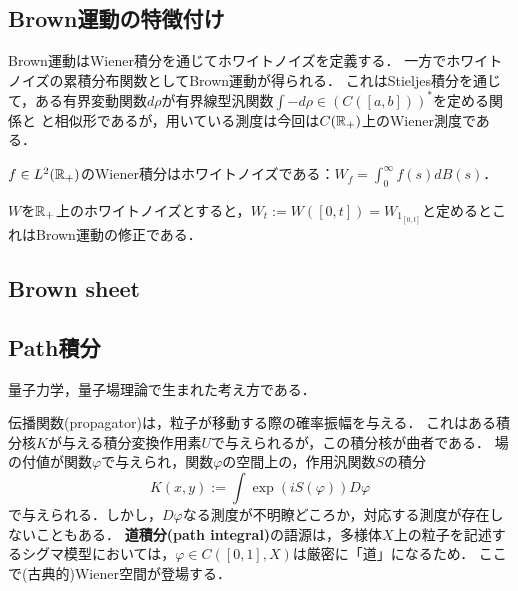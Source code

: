 \documentclass[uplatex,dvipdfmx]{jsreport}
\begin{document}
\subsection{Brown運動の特徴付け}

\begin{tcolorbox}[colframe=ForestGreen, colback=ForestGreen!10!white,breakable,colbacktitle=ForestGreen!40!white,coltitle=black,fonttitle=\bfseries\sffamily,
title=]
    Brown運動はWiener積分を通じてホワイトノイズを定義する．
    一方でホワイトノイズの累積分布関数としてBrown運動が得られる．
    これはStieljes積分を通じて，ある有界変動関数$d\rho$が有界線型汎関数$\int-d\rho\in (C([a,b]))^*$を定める関係と
    と相似形であるが，用いている測度は今回は$C(\mathbb{R}_+)$上のWiener測度である．
\end{tcolorbox}

\begin{proposition}
    $f\in L^2(\mathbb{R}_+)$のWiener積分はホワイトノイズである：$W_f=\int^\infty_0f(s)dB(s)$．
\end{proposition}

\begin{proposition}
    $W$を$\mathbb{R}_+$上のホワイトノイズとすると，$W_t:=W([0,t])=W_{1_{[0,t]}}$と定めるとこれはBrown運動の修正である．
\end{proposition}

\subsection{Brown sheet}

\subsection{Path積分}

\begin{tcolorbox}[colframe=ForestGreen, colback=ForestGreen!10!white,breakable,colbacktitle=ForestGreen!40!white,coltitle=black,fonttitle=\bfseries\sffamily,
title=]
    量子力学，量子場理論で生まれた考え方である．
\end{tcolorbox}

\begin{discussion}
    伝播関数(propagator)は，粒子が移動する際の確率振幅を与える．
    これはある積分核$K$が与える積分変換作用素$U$で与えられるが，この積分核が曲者である．
    場の付値が関数$\varphi$で与えられ，関数$\varphi$の空間上の，作用汎関数$S$の積分
    \[K(x,y):=\int\exp(iS(\varphi))D\varphi\]
    で与えられる．しかし，$D\varphi$なる測度が不明瞭どころか，対応する測度が存在しないこともある．
    \textbf{道積分(path integral)}の語源は，多様体$X$上の粒子を記述するシグマ模型においては，$\varphi\in C([0,1],X)$は厳密に「道」になるため．
    ここで(古典的)Wiener空間が登場する．
\end{discussion}
\end{document}
